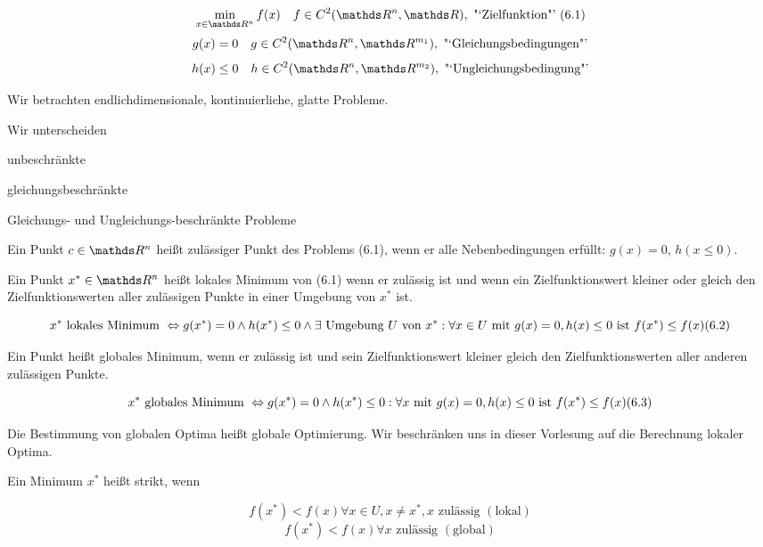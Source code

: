 

\[ \min_{x \in \R^n} f(x) \quad f \in C^2(\R^n, \R), \text{ "`Zielfunktion"' } (6.1) \]
\[ g(x) = 0 \quad g \in C^2(\R^n, \R^{m_1}), \text{ "`Gleichungsbedingungen"'} \]
\[ h(x) \leq 0 \quad h \in C^2(\R^n, \R^{m_2}), \text{ "`Ungleichungsbedingung"'} \]

Wir betrachten endlichdimensionale, kontinuierliche, glatte Probleme.

Wir unterscheiden

\bitm
\item unbeschränkte 
\item gleichungsbeschränkte
\item Gleichungs- und Ungleichungs-beschränkte Probleme
\eitm


Ein Punkt $c \in \R^n$ heißt zulässiger Punkt des Problems (6.1), wenn er alle Nebenbedingungen erfüllt: $g(x) = 0$, $h(x \leq 0)$.


Ein Punkt $x^* \in \R^n$ heißt lokales Minimum von (6.1) wenn er zulässig ist und wenn ein Zielfunktionswert kleiner oder gleich den Zielfunktionswerten aller zulässigen Punkte in einer Umgebung von $x^*$ ist.

\[ x^* \text{ lokales Minimum } \Leftrightarrow g(x^*) = 0 \wedge h(x^*) \leq 0 \wedge \exists \text{ Umgebung } U \text{ von } x^*: \forall x \in U \text{ mit } g(x) = 0, h(x) \leq 0 \text{ ist } f(x^*) \leq f(x) (6.2) \]


Ein Punkt heißt globales Minimum, wenn er zulässig ist und sein Zielfunktionswert kleiner gleich den Zielfunktionswerten aller anderen zulässigen Punkte.

\[ x^* \text{ globales Minimum } \Leftrightarrow g(x^*) = 0 \wedge h(x^*) \leq 0: \forall x \text{ mit } g(x) = 0, h(x) \leq 0 \text{ ist } f(x^*) \leq f(x) (6.3) \]

Die Bestimmung von globalen Optima heißt globale Optimierung. Wir beschränken uns in dieser Vorlesung auf die Berechnung lokaler Optima.


Ein Minimum $x^*$ heißt strikt, wenn

\[ f(x^*) < f(x) \forall x \in U, x \neq x^*, x \text{ zulässig } (\text{lokal}) \]
\[ f(x^*) < f(x) \forall x \text{ zulässig } (\text{global}) \]

